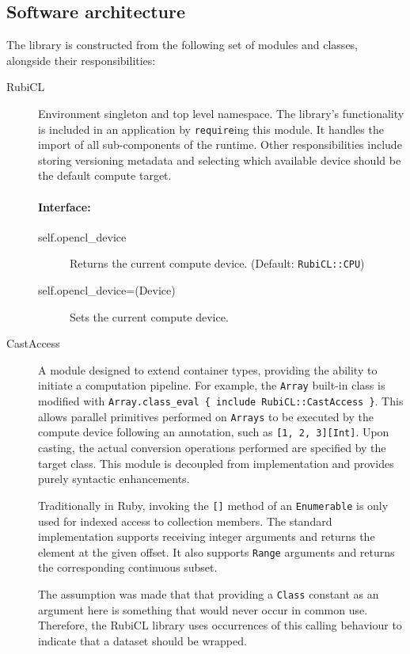 \subsection{Software architecture}
The library is constructed from the following set of modules and classes, alongside their responsibilities:
\begin{description}
  \item[RubiCL] Environment singleton and top level namespace.
The library's functionality is included in an application by \verb|require|ing this module. It handles the import of all sub-components of the runtime.
Other responsibilities include storing versioning metadata and selecting which available device should be the default compute target.

\paragraph*{Interface:}
\begin{description}
  \item[self.opencl\_device] Returns the current compute device. (Default: \verb|RubiCL::CPU|)
  \item[self.opencl\_device=(Device)] Sets the current compute device.
\end{description}

  \item[CastAccess] A module designed to extend container types, providing the ability to initiate a computation pipeline.
For example, the \verb|Array| built-in class is modified with \verb|Array.class_eval { include RubiCL::CastAccess }|.
This allows parallel primitives performed on \verb|Arrays| to be executed by the compute device following an annotation, such as \verb|[1, 2, 3][Int]|.
Upon casting, the actual conversion operations performed are specified by the target class. This module is decoupled from implementation and provides purely syntactic enhancements.

Traditionally in Ruby, invoking the \verb|[]| method of an \verb|Enumerable| is only used for indexed access to collection members. The standard implementation supports receiving integer arguments and returns the element at the given offset. It also supports \verb|Range| arguments and returns the corresponding continuous subset.

The assumption was made that that providing a \verb|Class| constant as an argument here is something that would never occur in common use. Therefore, the RubiCL library uses occurrences of this calling behaviour to indicate that a dataset should be wrapped.


\end{description}
